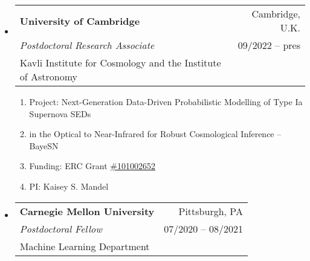 \documentclass[letterpaper,10pt]{extarticle}
\makeatletter
\newcommand{\subheadingtwolines}[4]{
\begin{tabular*}{6.55in}{l@{\cftdotfill{\cftsecdotsep}\extracolsep{\fill}}r}
#1 & #2 \\
#3 & #4 \\
\end{tabular*}}
\newcommand{\subheadingthreelines}[6]{
\begin{tabular*}{6.55in}{l@{\cftdotfill{\cftsecdotsep}\extracolsep{\fill}}r}
#1 & #2 \\
#3 & #4 \\
#5 & #6 \\
\end{tabular*}}
\makeatother
\begin{document}
\begin{itemize}[leftmargin=0.4cm, itemsep=0.5cm]



\item[] \hspace{-2ex}\subheadingthreelines{\bf University of Cambridge}{Cambridge, U.K.}{{\it Postdoctoral Research Associate}}{09/2022 -- pres}{Kavli Institute for Cosmology and the Institute of Astronomy}{}

\begin{enumerate}[leftmargin=0.3cm, itemsep=-0.05ex]
	\item[] Project: Next-Generation Data-Driven Probabilistic Modelling of Type Ia Supernova SEDs 
	\item[] \hspace{9.125ex}in the Optical to Near-Infrared for Robust Cosmological Inference -- BayeSN
	\item[] Funding: ERC Grant \href{https://www.ast.cam.ac.uk/content/dr.kaisey.mandel.awarded.erc.consolidator.grant}{\#101002652}
	\item[] PI: Kaisey S. Mandel
\end{enumerate}

\item[] \hspace{-2ex}\subheadingthreelines{\bf Carnegie Mellon University}{Pittsburgh, PA}{{\it Postdoctoral Fellow}}{07/2020 -- 08/2021}{Machine Learning Department}{}


\end{itemize}
\end{document}
